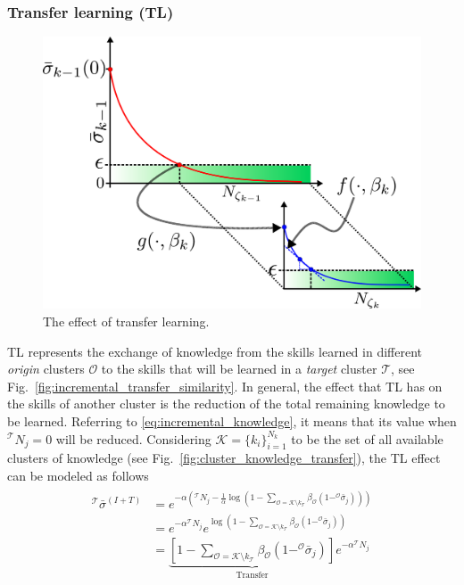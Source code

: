 \subsubsection{\textbf{Transfer learning (TL)}}
\begin{figure}[!h]
	\centering
	\includegraphics[width=0.9\columnwidth]{fig/effect_transfer_learning.pdf}
	\caption{The effect of transfer learning.}
	\label{fig:effect_transfer_learning}
\end{figure}
TL represents the exchange of knowledge from the skills learned in different \emph{origin} clusters $\mathcal{O}$ to the skills that will be learned in a \emph{target} cluster $\mathcal{T}$, see Fig.~\ref{fig:incremental_transfer_similarity}. In general, the effect that TL has on the skills of another cluster is the reduction of the total remaining knowledge to be learned. Referring to \eqref{eq:incremental_knowledge}, it means that its value when $^\mathcal{T}N_j = 0$ will be reduced. Considering $\mathcal{K} = \{ k_i \}^{N_k}_{i=1}$ to be the set of all available clusters of knowledge (see Fig.~\ref{fig:cluster_knowledge_transfer}), the TL effect can be modeled as follows
\begin{align}
    \begin{split}
        ^\mathcal{T}\bar{\sigma}^{(I+T)} &= e^{-\alpha \left(^\mathcal{T}N_j - \frac{1}{\alpha}  \log\left( 1- \sum\limits_{\mathcal{O}=\mathcal{K} \setminus k_\mathcal{T}}\beta_\mathcal{O}(1 - ^\mathcal{O}\bar{\sigma}_j) \right) \right)}\\
             &= e^{-\alpha {{^\mathcal{T}}N_j}}e^{  \log\left( 1-\sum\limits_{\mathcal{O}=\mathcal{K} \setminus k_\mathcal{T}}\beta_\mathcal{O}(1 - ^\mathcal{O}\bar{\sigma}_j) \right) }\\
             &= \underbrace{\left[1- \sum\limits_{\mathcal{O}=\mathcal{K} \setminus k_\mathcal{T}}\beta_\mathcal{O} \left( 1 - ^\mathcal{O}\bar{\sigma}_j \right)\right]}_{\text{Transfer}}e^{-\alpha ^\mathcal{T}N_j}    
    \end{split}
\end{align}
